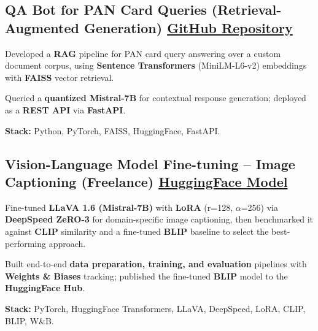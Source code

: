\documentclass[letter,10pt]{article}
\begin{document}
\subsection{QA Bot for PAN Card Queries (Retrieval-Augmented Generation) \hfill \href{https://github.com/sunil448832/Natural-Language-Processing/tree/master/RAG(Retrieval\%20Augment\%20Generation)}{GitHub Repository}}
\begin{zitemize}
\item Developed a \textbf{RAG} pipeline for PAN card query answering over a custom document corpus, using \textbf{Sentence Transformers} (MiniLM-L6-v2) embeddings with \textbf{FAISS} vector retrieval.
\item Queried a \textbf{quantized Mistral-7B} for contextual response generation; deployed as a \textbf{REST API} via \textbf{FastAPI}.
\item \textbf{Stack:} Python, PyTorch, FAISS, HuggingFace, FastAPI.
\end{zitemize}

\subsection{Vision-Language Model Fine-tuning – Image Captioning (Freelance) \hfill \href{https://huggingface.co/sunil448832/blip-model}{HuggingFace Model}}
\begin{zitemize}
\item Fine-tuned \textbf{LLaVA 1.6 (Mistral-7B)} with \textbf{LoRA} (r=128, $\alpha$=256) via \textbf{DeepSpeed ZeRO-3} for domain-specific image captioning, then benchmarked it against \textbf{CLIP} similarity and a fine-tuned \textbf{BLIP} baseline to select the best-performing approach.
\item Built end-to-end \textbf{data preparation, training, and evaluation} pipelines with \textbf{Weights \& Biases} tracking; published the fine-tuned \textbf{BLIP} model to the \textbf{HuggingFace Hub}.
\item \textbf{Stack:} PyTorch, HuggingFace Transformers, LLaVA, DeepSpeed, LoRA, CLIP, BLIP, W\&B.
\end{zitemize}
\end{document}
